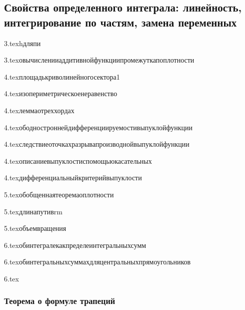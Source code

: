 \subsection{Свойства определенного интеграла: линейность, интегрирование по частям, замена переменных}

{3.tex}{hдляпи}

{3.tex}{овычисленииаддитивнойфункциипромежуткапоплотности}

{4.tex}{площадькриволинейногосектора1}

{4.tex}{изопериметрическоенеравенство}

{4.tex}{леммаотреххордах}

{4.tex}{ободностроннейдифференциируемостивыпуклойфункции}

{4.tex}{следствиеоточкахразрывапроизводнойвыпуклойфункции}

{4.tex}{описаниевыпуклостиспомощьюкасательных}

{4.tex}{дифференциальныйкритерийвыпуклости}

{5.tex}{обобщеннаятеоремаоплотности}

{5.tex}{длинапутивrm}

{5.tex}{объемвращения}

{6.tex}{обинтегралекакпределеинтегральныхсумм}

{6.tex}{обинтегральныхсуммахдляцентральныхпрямоугольников}

{6.tex}{}
\subsubsection{Теорема о формуле трапеций}
